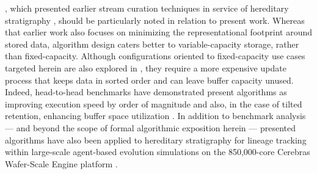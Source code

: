 
\citet{moreno2024algorithms}, which presented earlier stream curation techniques in service of hereditary stratigraphy \citep{moreno2022hstrat}, should be particularly noted in relation to present work.
Whereas that earlier work also focuses on minimizing the representational footprint around stored data, algorithm design caters better to variable-capacity storage, rather than fixed-capacity.
Although configurations oriented to fixed-capacity use cases targeted herein are also explored in \citet{moreno2024algorithms}, they require a more expensive update process that keeps data in sorted order and can leave buffer capacity unused.
Indeed, head-to-head benchmarks have demonstrated present algorithms as improving execution speed by order of magnitude and also, in the case of tilted retention, enhancing buffer space utilization \citep{moreno2024guide,moreno2024trackable}.
In addition to benchmark analysis --- and beyond the scope of formal algorithmic exposition herein --- presented algorithms have also been applied to hereditary stratigraphy for lineage tracking within large-scale agent-based evolution simulations on the 850,000-core Cerebras Wafer-Scale Engine platform \citep{moreno2024trackable}.

